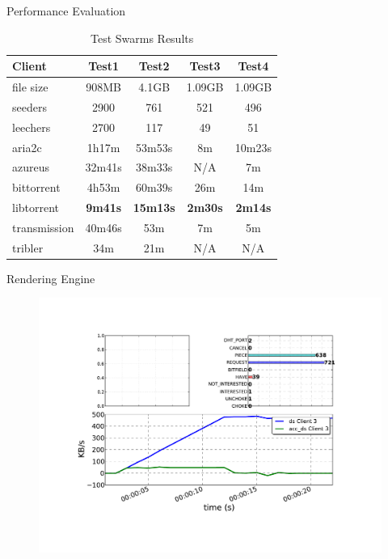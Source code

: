 \documentclass{beamer}
\begin{document}
\begin{frame}{Performance Evaluation}
  \begin{table}[ht]
    \centering
    \begin{tabular}{@{}lcccc@{}}
      \toprule
      \textbf{Client} & \textbf{Test1} & \textbf{Test2} & \textbf{Test3} &
      \textbf{Test4} \\
      \midrule
      file size & 908MB & 4.1GB & 1.09GB & 1.09GB	\\
      seeders & 2900 & 761 & 521 & 496	\\
      leechers & 2700 & 117 & 49 & 51	\\
      \midrule
      aria2c & 1h17m & 53m53s & 8m & 10m23s	\\
      azureus & 32m41s & 38m33s & N/A & 7m	\\
      bittorrent & 4h53m & 60m39s & 26m & 14m	\\
      libtorrent & \textbf{9m41s} & \textbf{15m13s} & \textbf{2m30s} & \textbf{2m14s}	\\
      transmission & 40m46s & 53m & 7m & 5m	\\
      tribler & 34m & 21m & N/A & N/A		\\
      \bottomrule
    \end{tabular}
    \caption{Test Swarms Results}
    \label{table:testsw}
  \end{table}
\end{frame}

\begin{frame}{Rendering Engine}
  \begin{figure}
    \includegraphics[scale=0.3]{img/test3}
  \end{figure}
\end{frame}
\end{document}
